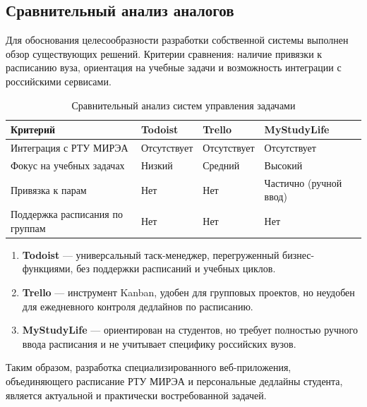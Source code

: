 \subsection{Сравнительный анализ аналогов}

Для обоснования целесообразности разработки собственной системы выполнен обзор существующих решений. Критерии сравнения: наличие привязки к расписанию вуза, ориентация на учебные задачи и возможность интеграции с российскими сервисами.

\begin{table}[h!]
\centering
\caption{Сравнительный анализ систем управления задачами}
\begin{tabular}{|p{4.2cm}|p{3.2cm}|p{3.2cm}|p{3.2cm}|}
\hline
\textbf{Критерий} & \textbf{Todoist} & \textbf{Trello} & \textbf{MyStudyLife} \\ \hline
Интеграция с РТУ МИРЭА & Отсутствует & Отсутствует & Отсутствует \\ \hline
Фокус на учебных задачах & Низкий & Средний & Высокий \\ \hline
Привязка к парам & Нет & Нет & Частично (ручной ввод) \\ \hline
Поддержка расписания по группам & Нет & Нет & Нет \\ \hline
\end{tabular}
\end{table}

\begin{enumerate}
    \item \textbf{Todoist} --- универсальный таск-менеджер, перегруженный бизнес-функциями, без поддержки расписаний и учебных циклов.
    \item \textbf{Trello} --- инструмент Kanban, удобен для групповых проектов, но неудобен для ежедневного контроля дедлайнов по расписанию.
    \item \textbf{MyStudyLife} --- ориентирован на студентов, но требует полностью ручного ввода расписания и не учитывает специфику российских вузов.
\end{enumerate}

Таким образом, разработка специализированного веб-приложения, объединяющего расписание РТУ МИРЭА и персональные дедлайны студента, является актуальной и практически востребованной задачей.
